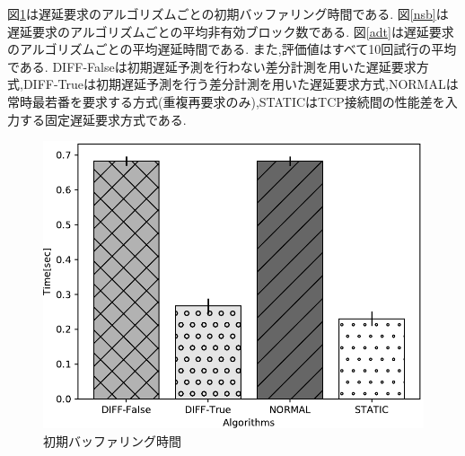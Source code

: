 \documentclass[a4j,12pt]{gradthesis_utf8}
\begin{document}
図\ref{ibt}は遅延要求のアルゴリズムごとの初期バッファリング時間である.
図\ref{nsb}は遅延要求のアルゴリズムごとの平均非有効ブロック数である.
図\ref{adt}は遅延要求のアルゴリズムごとの平均遅延時間である.
また,評価値はすべて10回試行の平均である.
DIFF-Falseは初期遅延予測を行わない差分計測を用いた遅延要求方式,DIFF-Trueは初期遅延予測を行う差分計測を用いた遅延要求方式,NORMALは常時最若番を要求する方式(重複再要求のみ),STATICはTCP接続間の性能差を入力する固定遅延要求方式である.

\begin{figure}[h]
	\centering
	\includegraphics[width=13.5cm]{figure/InitialBufferingTimeTB.pdf}
	\caption{初期バッファリング時間}
	\label{ibt}
\end{figure}
\end{document}
